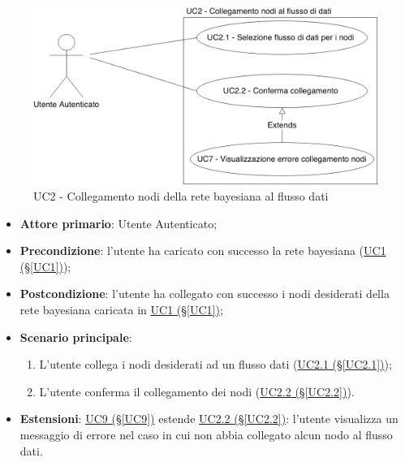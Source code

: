 \begin{figure}[H]
\centering
\includegraphics[scale=0.4]{./images/UC2.png}
\caption{UC2 - Collegamento nodi della rete bayesiana al flusso dati}
\end{figure}

\begin{itemize}
\item \textbf{Attore primario}: Utente Autenticato;
\item \textbf{Precondizione}: l'utente ha caricato con successo la rete bayesiana (\hyperref[UC1]{UC1 (§\ref*{UC1})});
\item \textbf{Postcondizione}: l'utente ha collegato con successo i nodi desiderati della rete bayesiana caricata in \hyperref[UC1]{UC1 (§\ref*{UC1})};
\item \textbf{Scenario principale}:
	\begin{enumerate}
	\item L'utente collega i nodi desiderati ad un flusso dati (\hyperref[UC2.1]{UC2.1 (§\ref*{UC2.1})});
	\item L'utente conferma il collegamento dei nodi (\hyperref[UC2.2]{UC2.2 (§\ref*{UC2.2})}).
	\end{enumerate}
\item \textbf{Estensioni}: \hyperref[UC9]{UC9 (§\ref*{UC9})} estende \hyperref[UC2.2]{UC2.2 (§\ref*{UC2.2})}: l'utente visualizza un messaggio di errore nel caso in cui non abbia collegato alcun nodo al flusso dati.
\end{itemize}

